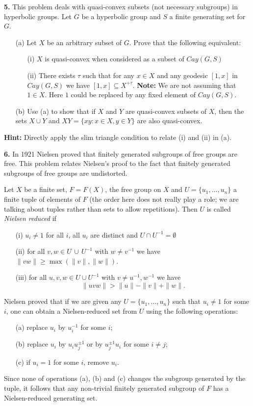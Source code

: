 \documentclass[12pt]{amsart}
\begin{document}
\skv
{\bf 5.} This problem deals with quasi-convex subsets (not necessary subgroups) in hyperbolic groups. Let $G$ be a hyperbolic group
and $S$ a finite generating set for $G$.  
\begin{itemize}
\item[(a)] Let $X$ be an arbitrary subset of $G$. Prove that the following equivalent:
\begin{itemize}
\item[(i)] $X$ is quasi-convex when considered as a subset of $Cay(G,S)$
\item[(ii)] There exists $\tau$ such that for any $x\in X$ and any geodesic $[1,x]$ in $Cay(G,S)$ we have $[1,x]\subseteq X^{+\tau}$.
{\bf Note:} We are not assuming that $1\in X$. Here $1$ could be replaced by any fixed element of $Cay(G,S)$.
\end{itemize}
\item[(b)] Use (a) to show that if $X$ and $Y$ are quasi-convex subsets of $X$, then the sets $X\cup Y$ and $XY=\{xy: x\in X, y\in Y\}$
are also quasi-convex.
\end{itemize}
{\bf Hint:} Directly apply the slim triangle condition to relate (i) and (ii) in (a).



\skv

{\bf 6.} In 1921 Nielsen proved that finitely generated subgroups of free groups are free. This problem relates Nielsen's proof to the fact
that finitely generated subgroups of free groups are undistorted.

Let $X$ be a finite set, $F=F(X)$, the free group on $X$ and $U=\{u_1,\ldots, u_n\}$ a finite  tuple of elements of $F$
(the order here does not really play a role; we are talking about tuples rather than sets to allow repetitions).
Then $U$
is called {\it Nielsen reduced} if
\begin{itemize}
\item[(i)] $u_i\neq 1$ for all $i$, all $u_i$ are distinct and $U\cap U^{-1}=\emptyset$
\item[(ii)] for all $v,w\in U\,\cup\, U^{-1}$ with $w\neq v^{-1}$ we have $\|vw\|\geq \max(\|v\|,\|w\|)$.
\item[(iii)] for all $u,v,w\in U\cup U^{-1}$ with $v\neq u^{-1},w^{-1}$ we have
$$\|uvw\|>\|u\|-\|v\|+\|w\|.$$
\end{itemize}
Nielsen proved that if we are given any $U=\{u_1,\ldots, u_n\}$ such that $u_i\neq 1$ for some $i$, one can obtain a Nielsen-reduced set from
$U$ using the following operations: 
\begin{itemize}
\item[(a)] replace $u_i$ by $u_i^{-1}$ for some $i$;
\item[(b)] replace $u_i$ by $u_i u_j^{\pm 1}$ or by $u_j^{\pm 1} u_i$ for some $i\neq j$;
\item[(c)] if $u_i=1$ for some $i$, remove $u_i$.
\end{itemize}
Since none of operations (a), (b) and (c) changes the subgroup generated by the tuple, it follows that any non-trivial finitely generated
subgroup of $F$ has a Nielsen-reduced generating set.
\end{document}
